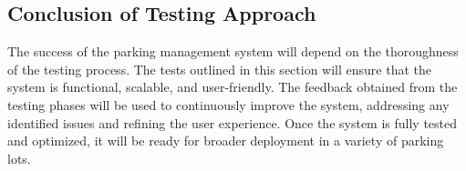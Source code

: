 \subsection{Conclusion of Testing Approach}

The success of the parking management system will depend on the thoroughness of the testing process. The tests outlined in this section will ensure that the system is functional, scalable, and user-friendly. The feedback obtained from the testing phases will be used to continuously improve the system, addressing any identified issues and refining the user experience. Once the system is fully tested and optimized, it will be ready for broader deployment in a variety of parking lots.